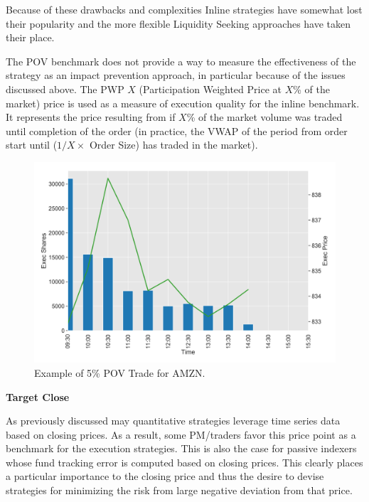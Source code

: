 Because of these drawbacks and complexities Inline strategies have somewhat lost their popularity and the more flexible Liquidity Seeking approaches  have taken their place.


The POV benchmark does not provide a way to measure the effectiveness of the strategy as an impact prevention approach, in particular because of the issues discussed above. The PWP $X$ (Participation Weighted Price at $X$\% of the market) price is used as a measure of execution quality for the inline benchmark. It represents the price resulting from if $X$\% of the market volume was traded until completion of the order (in practice, the VWAP of the period from order start until ($1/X \times$ Order Size) has traded in the market). \twomedskip

	\begin{figure}[!ht]
	\centering
	\includegraphics[width=\textwidth]{chapters/chapter_exec_models/figures/pov.png} 
	\caption{Example of 5\% POV Trade for AMZN.\label{fig:pov}}
	\end{figure}


\noindent\textbf{Target Close} \twomedskip


As previously discussed may quantitative strategies leverage time series data based on closing prices. As a result, some PM/traders favor this price point as a benchmark for the execution strategies. This is also the case for passive indexers whose fund tracking error is computed based on closing prices. This clearly places a particular importance to the closing price and thus the desire to devise strategies for minimizing the risk from large negative deviation from that price.


